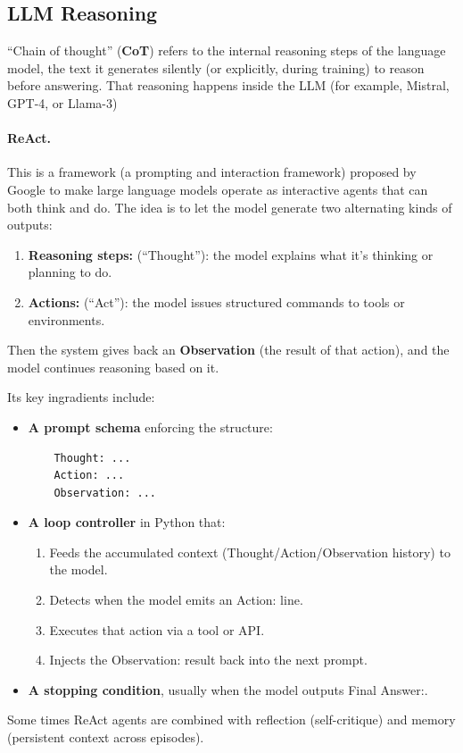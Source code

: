 \documentclass[11pt]{article}  %
\begin{document}
\subsection{LLM Reasoning}
``Chain of thought'' (\textbf{CoT}) refers to the internal reasoning steps of the language model, the text it generates silently (or explicitly, during training) to reason before answering.
That reasoning happens inside the LLM (for example, Mistral, GPT-4, or Llama-3)

\paragraph{ReAct.} This is a framework (a prompting and interaction framework) proposed by Google to make large language models operate as interactive agents that can both think and do.
The idea is to let the model generate two alternating kinds of outputs:
\begin{enumerate}
  \item \textbf{Reasoning steps:} (``Thought''): the model explains what it's thinking or planning to do.
  \item \textbf{Actions:} (``Act''): the model issues structured commands to tools or environments.
\end{enumerate}
Then the system gives back an \textbf{Observation} (the result of that action),
and the model continues reasoning based on it.

Its key ingradients include:
\begin{itemize}
  \item \textbf{A prompt schema} enforcing the structure:
  \begin{lstlisting}
    Thought: ...
    Action: ...
    Observation: ...
  \end{lstlisting}

  \item \textbf{A loop controller} in Python that: 
  \begin{enumerate}
    \item Feeds the accumulated context (Thought/Action/Observation history) to the model.
    \item Detects when the model emits an Action: line.
    \item Executes that action via a tool or API.
    \item Injects the Observation: result back into the next prompt.
  \end{enumerate}

  \item \textbf{A stopping condition}, usually when the model outputs Final Answer:.
\end{itemize}
Some times ReAct agents are combined with reflection (self-critique) and memory (persistent context across episodes).
\end{document}
